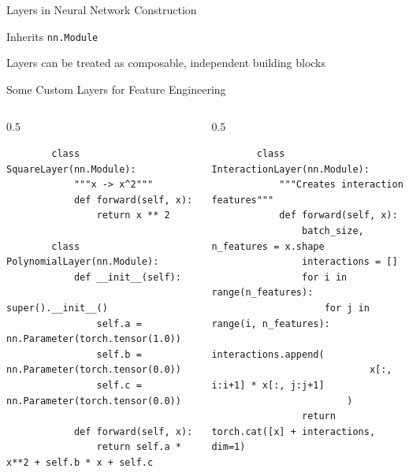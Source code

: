 \documentclass[aspectratio=169,xcolor=dvipsnames,svgnames,x11names,fleqn]{beamer}
\begin{document}
\begin{frame}{Layers in Neural Network Construction}

    \begin{block}{}
        Inherits \texttt{nn.Module}

        \bigskip

        Layers can be treated as composable, independent building blocks
    \end{block}
    
\end{frame}


\begin{frame}[fragile]{Some Custom Layers for Feature Engineering}

    \begin{columns}
        \begin{column}{0.5\textwidth}
        \begin{verbatim}
        class SquareLayer(nn.Module):
            """x -> x^2"""
            def forward(self, x):
                return x ** 2

        class PolynomialLayer(nn.Module):
            def __init__(self):
                super().__init__()
                self.a = nn.Parameter(torch.tensor(1.0))
                self.b = nn.Parameter(torch.tensor(0.0))
                self.c = nn.Parameter(torch.tensor(0.0))
            
            def forward(self, x):
                return self.a * x**2 + self.b * x + self.c
        \end{verbatim}
        \end{column}

        \begin{column}{0.5\textwidth}
        \begin{verbatim}
        class InteractionLayer(nn.Module):
            """Creates interaction features"""
            def forward(self, x):
                batch_size, n_features = x.shape
                interactions = []
                for i in range(n_features):
                    for j in range(i, n_features):
                        interactions.append(
                            x[:, i:i+1] * x[:, j:j+1]
                        )
                return torch.cat([x] + interactions, dim=1)
        \end{verbatim}
        \end{column}
        \end{columns}

    
\end{frame}
\end{document}
